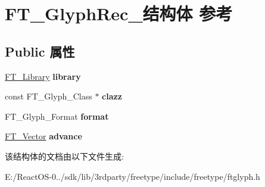 \hypertarget{struct_f_t___glyph_rec__}{}\section{F\+T\+\_\+\+Glyph\+Rec\+\_\+结构体 参考}
\label{struct_f_t___glyph_rec__}
\subsection*{Public 属性}
\begin{DoxyCompactItemize}
\item 
\mbox{\label{struct_f_t___glyph_rec___a00679b5e2519affab0f3999718817f8e}} 
\hyperlink{struct_f_t___library_rec__}{F\+T\+\_\+\+Library} {\bfseries library}
\item 
\mbox{\label{struct_f_t___glyph_rec___ad7074cfe0e9fd6616e4dc4011e481524}} 
const F\+T\+\_\+\+Glyph\+\_\+\+Class $\ast$ {\bfseries clazz}
\item 
\mbox{\label{struct_f_t___glyph_rec___a26b42a2610a69dcaed3e7c8b6d506211}} 
F\+T\+\_\+\+Glyph\+\_\+\+Format {\bfseries format}
\item 
\mbox{\label{struct_f_t___glyph_rec___afd95b047df6a249db79018a279137018}} 
\hyperlink{struct_f_t___vector__}{F\+T\+\_\+\+Vector} {\bfseries advance}
\end{DoxyCompactItemize}


该结构体的文档由以下文件生成\+:\begin{DoxyCompactItemize}
\item 
E\+:/\+React\+O\+S-\/0../sdk/lib/3rdparty/freetype/include/freetype/ftglyph.\+h\end{DoxyCompactItemize}
